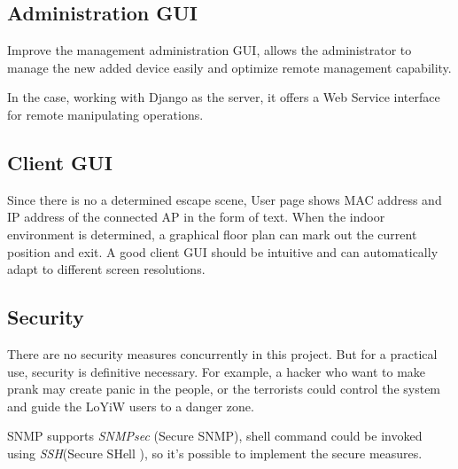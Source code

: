 \subsection{Administration GUI}

Improve the management administration GUI, allows the administrator to manage the new added device easily and optimize remote management capability.

In the case, working with Django as the server, it offers a Web Service interface for remote manipulating operations.

\subsection{Client GUI}

Since there is no a determined escape scene, User page shows MAC address and IP address of the connected AP in the form of text. When the indoor environment is determined, a graphical floor plan can mark out the current position and exit. A good client GUI should be intuitive and can automatically adapt to different screen resolutions.

\subsection{Security}

There are no security measures concurrently in this project. But for a practical use, security is definitive necessary. For example, a hacker who want to make prank may create panic in the people, or the terrorists could control the system and guide the LoYiW users to a danger zone.

SNMP supports \textit{SNMPsec} (Secure SNMP), shell command could be invoked using \textit{SSH}(Secure SHell ), so it's possible to implement the secure measures.